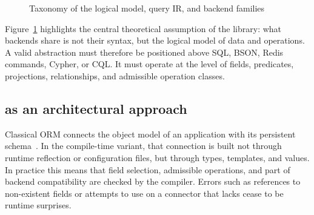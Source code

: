 \begin{figure}[H]
\centering
{}
\caption{Taxonomy of the logical model, query IR, and backend families}
\label{fig:storage_taxonomy}
\end{figure}

Figure~\ref{fig:storage_taxonomy} highlights the central theoretical assumption of the library: what backends share is not their syntax, but the logical model of data and operations. A valid abstraction must therefore be positioned above SQL, BSON, Redis commands, Cypher, or CQL. It must operate at the level of fields, predicates, projections, relationships, and admissible operation classes.

\subsection{\ORMName{} as an architectural approach}

Classical ORM connects the object model of an application with its persistent schema~\cite{fowler2002}. In the compile-time variant, that connection is built not through runtime reflection or configuration files, but through types, templates, and  values. In practice this means that field selection, admissible operations, and part of backend compatibility are checked by the compiler. Errors such as references to non-existent fields or attempts to use  on a connector that lacks  cease to be runtime surprises.

